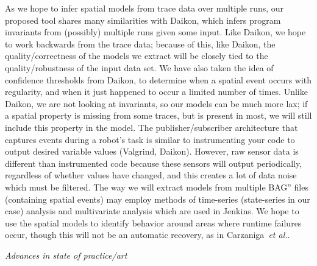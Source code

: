 \documentclass{article}
\newcommand\etal{\emph{et al.}}
\begin{document}
As we hope to infer spatial models from trace data over multiple runs, our proposed tool shares many similarities with Daikon, which infers program invariants from (possibly) multiple runs given some input.
Like Daikon, we hope to work backwards from the trace data; because of this, like Daikon, the quality/correctness of the models we extract will be closely tied to the quality/robustness of the input data set.
We have also taken the idea of confidence thresholds from Daikon, to determine when a spatial event occurs with regularity, and when it just happened to occur a limited number of times.
Unlike Daikon, we are not looking at invariants, so our models can be much more lax; if a spatial property is missing from some traces, but is present in most, we will still include this property in the model.
The publisher/subscriber architecture that captures events during a robot's task is similar to instrumenting your code to output desired variable values (Valgrind, Daikon).
However, raw sensor data is different than instrumented code because these sensors will output periodically, regardless of whether values have changed, and this creates a lot of data noise which must be filtered.
The way we will extract models from multiple BAG'' files (containing spatial events) may employ methods of time-series (state-series in our case) analysis and multivariate analysis which are used in Jenkins.  
We hope to use the spatial models to identify behavior around areas where runtime failures occur, though this will not be an automatic recovery, as in Carzaniga~\etal.

\emph{Advances in state of practice/art}



\end{document}
